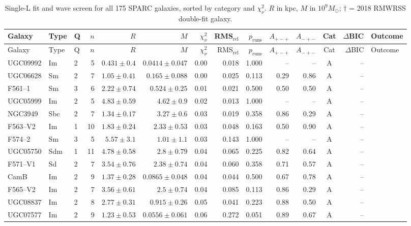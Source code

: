 \documentclass[9pt]{extarticle}
\begin{document}
{\scriptsize\setlength{\tabcolsep}{3.5pt}
\begin{longtable}{lllrrrrrrrrcrl}
\caption{Single-L fit and wave screen for all 175 SPARC galaxies, sorted by category and $\chi^2_\nu$. $R$ in kpc, $M$ in $10^9M_\odot$; $\dagger$ = 2018 RMWRSS double-fit galaxy.}\\\toprule
Galaxy & Type & Q & $n$ & $R$ & $M$ & $\chi^2_\nu$ & RMS$_\mathrm{rel}$ & $p_\mathrm{runs}$ & $A_{+-+}$ & $A_{-+-}$ & Cat & $\Delta$BIC & Outcome\\\midrule\endfirsthead
\toprule Galaxy & Type & Q & $n$ & $R$ & $M$ & $\chi^2_\nu$ & RMS$_\mathrm{rel}$ & $p_\mathrm{runs}$ & $A_{+-+}$ & $A_{-+-}$ & Cat & $\Delta$BIC & Outcome\\\midrule\endhead
\bottomrule\endfoot
UGC09992 & Im & 2 & 5 & $0.431\pm0.4$ & $0.0414\pm0.047$ & 0.00 & 0.018 & 1.000 & -- & -- & A & -- & \\
UGC06628 & Sm & 2 & 7 & $1.05\pm0.41$ & $0.165\pm0.088$ & 0.00 & 0.025 & 0.113 & 0.29 & 0.86 & A & -- & \\
F561--1 & Sm & 3 & 6 & $2.22\pm0.74$ & $0.524\pm0.25$ & 0.01 & 0.021 & 0.500 & 0.50 & 0.50 & A & -- & \\
UGC05999 & Im & 2 & 5 & $4.83\pm0.59$ & $4.62\pm0.9$ & 0.02 & 0.013 & 1.000 & -- & -- & A & -- & \\
NGC3949 & Sbc & 2 & 7 & $1.34\pm0.17$ & $3.27\pm0.6$ & 0.03 & 0.019 & 0.358 & 0.86 & 0.29 & A & -- & \\
F563--V2 & Im & 1 & 10 & $1.83\pm0.24$ & $2.33\pm0.53$ & 0.03 & 0.048 & 0.163 & 0.50 & 0.90 & A & -- & \\
F574--2 & Sm & 3 & 5 & $5.57\pm3.1$ & $1.01\pm1.1$ & 0.03 & 0.143 & 1.000 & -- & -- & A & -- & \\
UGC05750 & Sdm & 1 & 11 & $4.78\pm0.58$ & $2.8\pm0.79$ & 0.04 & 0.065 & 0.225 & 0.82 & 0.64 & A & -- & \\
F571--V1 & Sd & 2 & 7 & $3.54\pm0.76$ & $2.38\pm0.74$ & 0.04 & 0.060 & 0.358 & 0.71 & 0.57 & A & -- & \\
CamB & Im & 2 & 9 & $1.37\pm0.28$ & $0.0865\pm0.048$ & 0.04 & 0.044 & 0.500 & 0.67 & 0.78 & A & -- & \\
F565--V2 & Im & 2 & 7 & $3.56\pm0.61$ & $2.5\pm0.74$ & 0.04 & 0.085 & 0.113 & 0.86 & 0.29 & A & -- & \\
UGC08837 & Im & 2 & 8 & $2.77\pm0.31$ & $0.915\pm0.26$ & 0.05 & 0.041 & 0.223 & 0.88 & 0.50 & A & -- & \\
UGC07577 & Im & 2 & 9 & $1.23\pm0.53$ & $0.0556\pm0.061$ & 0.06 & 0.272 & 0.051 & 0.89 & 0.67 & A & -- & \\

\end{longtable}}
\end{document}

